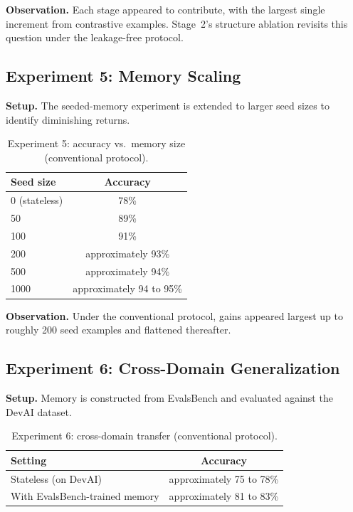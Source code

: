 \documentclass[12pt,a4paper]{report}
\begin{document}
\textbf{Observation.} Each stage appeared to contribute, with the largest single increment from contrastive examples. Stage~2's structure ablation revisits this question under the leakage-free protocol.

\subsection{Experiment 5: Memory Scaling}

\textbf{Setup.} The seeded-memory experiment is extended to larger seed sizes to identify diminishing returns.

\begin{table}[h]
\centering
\begin{tabular}{lc}
\toprule
Seed size & Accuracy \\
\midrule
0 (stateless) & 78\% \\
50 & 89\% \\
100 & 91\% \\
200 & approximately 93\% \\
500 & approximately 94\% \\
1000 & approximately 94 to 95\% \\
\bottomrule
\end{tabular}
\caption{Experiment 5: accuracy vs.\ memory size (conventional protocol).}
\end{table}

\textbf{Observation.} Under the conventional protocol, gains appeared largest up to roughly 200 seed examples and flattened thereafter.

\subsection{Experiment 6: Cross-Domain Generalization}

\textbf{Setup.} Memory is constructed from EvalsBench and evaluated against the DevAI dataset.

\begin{table}[h]
\centering
\begin{tabular}{lc}
\toprule
Setting & Accuracy \\
\midrule
Stateless (on DevAI) & approximately 75 to 78\% \\
With EvalsBench-trained memory & approximately 81 to 83\% \\
\bottomrule
\end{tabular}
\caption{Experiment 6: cross-domain transfer (conventional protocol).}
\end{table}
\end{document}
